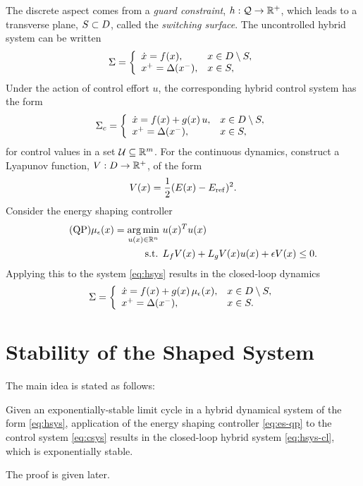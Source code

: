 \documentclass[twocolumn]{article}
\begin{document}
The discrete aspect comes from a {\em guard constraint}, $h : \mathcal{Q} \to \mathbb{R}^{+}$, which leads to a transverse plane, $S \subset D$, called the {\em switching surface}.
%
The uncontrolled hybrid system can be written
\begin{align}
  \Sigma = \left\{
  \begin{array}{l l}
    {\dot x} = f(x), & x \in D \setminus S,\\
    x^{+} = \Delta(x^{-}), &x \in S,
  \end{array}\right.
  \label{eq:hsys}
\end{align}
Under the action of control effort $u$, the corresponding hybrid control system has the form
\begin{align}
  \Sigma_{c} = \left\{
  \begin{array}{l l}
    {\dot x} = f(x) + g(x) \, u, & x \in D \setminus S,\\
    x^{+} = \Delta(x^{-}), &x \in S,
  \end{array}\right.
  \label{eq:csys}
\end{align}
for control values in a set $\mathcal{U} \subseteq \mathbb{R}^{m}$.
%
For the continuous dynamics, construct a Lyapunov function, $V : D \to \mathbb{R}^{+}$, of the form
\begin{align}
  \label{eq:lyap}
  V(x) = \frac{1}{2} (E(x) - E_{\mathrm{ref}})^2.
\end{align}
Consider the energy shaping controller
\begin{align}
  \label{eq:es-qp} \tag {QP}
  \mu_{\epsilon}(x) = \operatorname*{arg\,min}_{u(x) \in \mathbb{R}^{n}} \ & u(x)^T u(x)\\
  \nonumber
  \mbox{s.t. } & L_{f} V(x) + L_{g} V(x) u(x) + \epsilon V(x) \leq 0.
\end{align}
Applying this to the system \eqref{eq:hsys} results in the closed-loop dynamics
\begin{align}
  \label{eq:hsys-cl}
  \Sigma = \left\{
  \begin{array}{l l}
    {\dot x} = f(x) + g(x) \, \mu_{\epsilon}(x), & x \in D \setminus S,\\
    x^{+} = \Delta(x^{-}), &x \in S.
  \end{array}\right.
\end{align}



\section{Stability of the Shaped System}

The main idea is stated as follows:
%
\begin{theorem}
  Given an exponentially-stable limit cycle in a hybrid dynamical system of the form \eqref{eq:hsys}, application of the energy shaping controller \eqref{eq:es-qp} to the control system \eqref{eq:csys} results in the closed-loop hybrid system \eqref{eq:hsys-cl}, which is exponentially stable.
\end{theorem}
%
The proof is given later.
\end{document}
